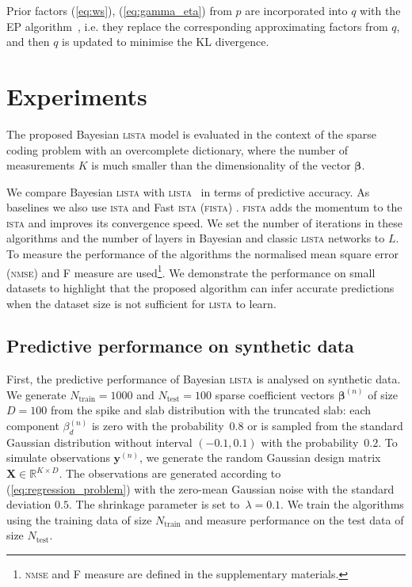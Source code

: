 \documentclass{article}
\begin{document}
  Prior factors (\ref{eq:ws}), (\ref{eq:gamma_eta}) from $p$ are incorporated into $q$ with the EP algorithm~\cite{hernandez2015probabilistic}, i.e. they replace the corresponding approximating factors from $q$, and then $q$ is updated to minimise the KL divergence.
  
  \section{Experiments}
  \label{sec:experiments}
  The proposed Bayesian \textsc{lista} model is evaluated in the context of the sparse coding problem with an overcomplete dictionary, where the number of measurements $K$ is much smaller than the dimensionality of the vector $\boldsymbol\beta$.
  
  We compare Bayesian \textsc{lista} with \textsc{lista}~\cite{gregor2010learning} in terms of predictive accuracy. As baselines we also use \textsc{ista} \cite{daubechies2004iterative} and Fast \textsc{ista} (\textsc{fista}) \cite{beck2009fast}. \textsc{fista} adds the momentum to the \textsc{ista} and improves its convergence speed. We set the number of iterations in these algorithms and the number of layers in Bayesian and classic \textsc{lista} networks to $L$. To measure the performance of the algorithms the normalised mean square error (\textsc{nmse}) and F measure are used\footnote{\textsc{nmse} and F measure are defined in the supplementary materials.}. We demonstrate the performance on small datasets to highlight that the proposed algorithm can infer accurate predictions when the dataset size is not sufficient for \textsc{lista} to learn.
  
  \subsection{Predictive performance on synthetic data}
  First, the predictive performance of Bayesian \textsc{lista} is analysed on synthetic data. We generate $N_\text{train}=1000$ and $N_{\text{test}} = 100$ sparse coefficient vectors $\boldsymbol\beta^{(n)}$ of size $D = 100$  from the spike and slab distribution with the truncated slab: each component $\beta^{(n)}_{d}$ is zero with the probability~$0.8$ or is sampled from the standard Gaussian distribution without interval $(-0.1, 0.1)$ with the probability~$0.2$. To simulate observations $\mathbf{y}^{(n)}$, we generate the random Gaussian design matrix $\mathbf{X} \in \mathbb{R}^{K \times D}$.  The observations are generated according to (\ref{eq:regression_problem}) with the zero-mean Gaussian noise with the standard deviation $0.5$. The shrinkage parameter is set to~$\lambda = 0.1$. We train the algorithms using the training data of size $N_\text{train}$ and measure performance on the test data of size $N_{\text{test}}$.
  
\end{document}
